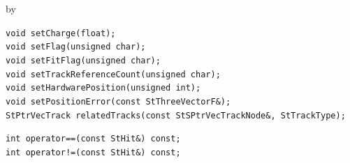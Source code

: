 \documentclass[twoside]{article}
\newcommand{\entrylabel}[1]{\mbox{\textbf{{#1}}}\hfil}%
\newenvironment{entry}
{\begin{list}{}%
    {\renewcommand{\makelabel}{\entrylabel}%
     \setlength{\labelwidth}{90pt}%
     \setlength{\leftmargin}{\labelwidth}
     \advance\leftmargin by \labelsep%
      }%
    }%
  {\end{list}}
\newcommand{\Entrylabel}[1]%
{\raisebox{0pt}[1ex][0pt]{\makebox[\labelwidth][l]%
    {\parbox[t]{\labelwidth}{\hspace{0pt}\textbf{{#1}}}}}}
\newenvironment{Entry}%
{\renewcommand{\entrylabel}{\Entrylabel}\begin{entry}}%
  {\end{entry}}
\begin{document}
\begin{Entry}
    \verb+void setCharge(float);+\\
    \verb+void setFlag(unsigned char);+\\
    \verb+void setFitFlag(unsigned char);+\\
    \verb+void setTrackReferenceCount(unsigned char);+\\
    \verb+void setHardwarePosition(unsigned int);+\\
    \verb+void setPositionError(const StThreeVectorF&);+\\
    \verb+StPtrVecTrack relatedTracks(const StSPtrVecTrackNode&, StTrackType);+\\
    
\item[Public Member\\ Operators]
    \verb+int operator==(const StHit&) const;+\\
    \verb+int operator!=(const StHit&) const;+\\
\end{Entry}
\clearpage
\end{document}
